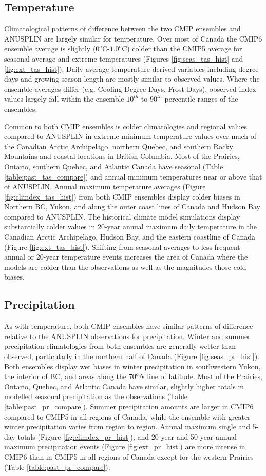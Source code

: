 \documentclass[]{scrartcl}
\begin{document}
\subsection{Temperature}
Climatological patterns of difference between the two CMIP ensembles and ANUSPLIN are largely similar for temperature. Over most of Canada the CMIP6 ensemble average is slightly ($0^o$C-$1.0^o$C) colder than the CMIP5 average for seasonal average and extreme temperatures (Figures \ref{fig:seas_tas_hist} and \ref{fig:ext_tas_hist}). Daily average temperature-derived variables including degree days and growing season length are mostly similar to observed values. Where the ensemble averages differ (e.g. Cooling Degree Days, Frost Days), observed index values largely fall within the ensemble $10^{th}$ to $90^{th}$ percentile ranges of the ensembles. 

Common to both CMIP ensembles is colder climatologies and regional values compared to ANUSPLIN in extreme minimum temperature values over much of the Canadian Arctic Archipelago, northern Quebec, and southern Rocky Mountains and coastal locations in British Columbia. Most of the Prairies, Ontario, southern Quebec, and Atlantic Canada have seasonal (Table \ref{table:past_tas_compare}) and annual minimum temperatures near or above that of ANUSPLIN. Annual maximum temperature averages (Figure \ref{fig:climdex_tas_hist}) from both CMIP ensembles display colder biases in Northern BC, Yukon, and along the outer coast lines of Canada and Hudson Bay compared to ANUSPLIN. The historical climate model simulations display substantially colder values in 20-year annual maximum daily temperature in the Canadian Arctic Archipelago, Hudson Bay, and the eastern coastline of Canada (Figure \ref{fig:ext_tas_hist}). Shifting from seasonal averages to less frequent annual or 20-year temperature events increases the area of Canada where the models are colder than the observations as well as the magnitudes those cold biases.


\subsection{Precipitation}
As with temperature, both CMIP ensembles have similar patterns of difference relative to the ANUSPLIN observations for precipitation. Winter and summer precipitation climatologies from both ensembles are generally wetter than observed, particularly in the northern half of Canada (Figure \ref{fig:seas_pr_hist}). Both ensembles display wet biases in winter precipitation in southwestern Yukon, the interior of BC, and areas along the $70^oN$ line of latitude. Most of the Prairies, Ontario, Quebec, and Atlantic Canada have similar, slightly higher totals in modelled seasonal precipitation as the observations (Table \ref{table:past_pr_compare}). Summer precipitation amounts are larger in CMIP6 compared to CMIP5 in all regions of Canada, while the ensemble with greater winter precipitation varies from region to region. Annual maximum single and 5-day totals (Figure \ref{fig:climdex_pr_hist}), and 20-year and 50-year annual maximum precipitation events (Figure \ref{fig:ext_pr_hist}) are more intense in CMIP6 than in CMIP5 in all regions of Canada except for the western Prairies (Table \ref{table:past_pr_compare}).  
\end{document}
